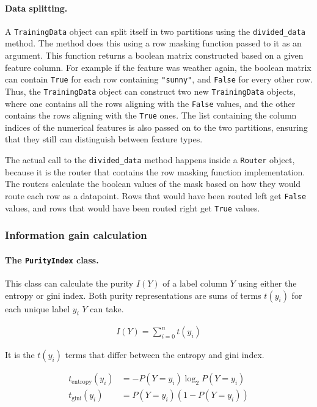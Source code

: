 \documentclass{article}
\begin{document}
\paragraph{Data splitting.}
A \texttt{TrainingData} object can split itself in two partitions using the \texttt{divided\_data} method.
The method does this using a row masking function passed to it as an argument.
This function returns a boolean matrix constructed based on a given feature column.
For example if the feature was weather again,
the boolean matrix can contain \texttt{True} for each row containing \texttt{"sunny"},
and \texttt{False} for every other row.
Thus, the \texttt{TrainingData} object can construct two new \texttt{TrainingData} objects,
where one contains all the rows aligning with the \texttt{False} values,
and the other contains the rows aligning with the \texttt{True} ones.
The list containing the column indices of the numerical features is also passed on to the two partitions,
ensuring that they still can distinguish between feature types.

The actual call to the \texttt{divided\_data} method happens inside a \texttt{Router} object,
because it is the router that contains the row masking function implementation.
The routers calculate the boolean values of the mask based on how they would route each row as a datapoint.
Rows that would have been routed left get \texttt{False} values,
and rows that would have been routed right get \texttt{True} values.

\subsubsection{Information gain calculation}

\paragraph{The \texttt{PurityIndex} class.}
This class can calculate the purity $I(Y)$ of a label column $Y$ using either the entropy or gini index.
Both purity representations are sums of terms $t(y_i)$ for each unique label $y_i$ $Y$ can take.

\begin{align*}
  I(Y) = \sum_{i=0}^{n}t(y_i)
\end{align*}

It is the $t(y_i)$ terms that differ between the entropy and gini index.

\begin{align*}
  t_{\text{entropy}}(y_i) &= - P(Y = y_i) \log_2 P(Y = y_i)\\ 
  t_{\text{gini}}(y_i) &= P(Y = y_i)(1 - P(Y = y_i))
\end{align*}
\end{document}
